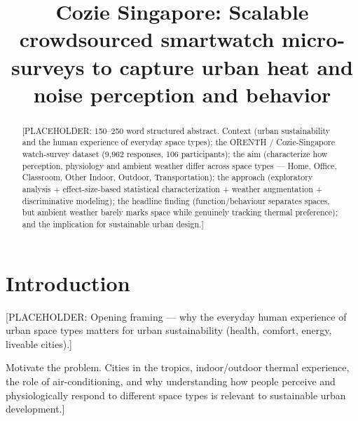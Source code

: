 \documentclass[]{interact}
\begin{document}

\title{Cozie Singapore: Scalable crowdsourced smartwatch micro-surveys to capture urban heat and noise perception and behavior}

\author{
}

\maketitle

\begin{abstract}
[PLACEHOLDER: 150--250 word structured abstract. Context (urban sustainability
and the human experience of everyday space types); the ORENTH / Cozie-Singapore
watch-survey dataset (9{,}962 responses, 106 participants); the aim (characterize
how perception, physiology and ambient weather differ across space types --- Home,
Office, Classroom, Other Indoor, Outdoor, Transportation); the approach
(exploratory analysis + effect-size-based statistical characterization + weather
augmentation + discriminative modeling); the headline finding (function/behaviour
separates spaces, but ambient weather barely marks space while genuinely tracking
thermal preference); and the implication for sustainable urban design.]
\end{abstract}

\begin{keywords}
\end{keywords}


\section{Introduction}\label{sec:intro}

[PLACEHOLDER: Opening framing --- why the everyday human experience of urban
space types matters for urban sustainability (health, comfort, energy, liveable
cities).]

Motivate the problem. Cities in the tropics, indoor/outdoor thermal
experience, the role of air-conditioning, and why understanding how people
perceive and physiologically respond to different space types is relevant to
sustainable urban development.]
\end{document}
